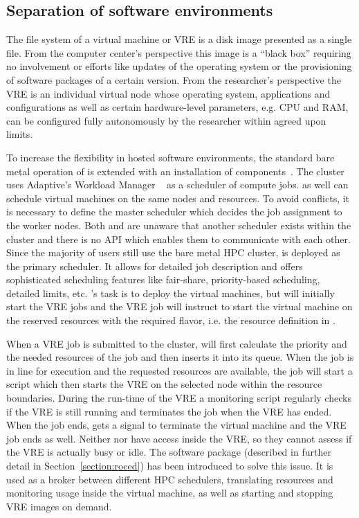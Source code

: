 \subsection{Separation of software environments}

The file system of a virtual machine or VRE is a
disk image presented as a single file. From the computer center's perspective
this image is a ``black box'' requiring no involvement or efforts like
updates of the operating system or the provisioning of software packages of a
certain version. From the researcher's perspective the VRE is an individual
virtual node whose operating system, applications and configurations
as well as certain hardware-level parameters, e.g. CPU and RAM, can be
configured fully autonomously by the researcher within agreed upon limits.


To increase the flexibility in hosted software environments, the standard bare metal
operation of \NEMO is extended with an installation of \Openstack
components~\cite{hpc-symp:2016}.
The \NEMO cluster uses Adaptive's Workload Manager \Moab~\cite{Moab} as a
scheduler of compute jobs.
\Openstack as well can schedule virtual machines on the same nodes and
resources.
To avoid conflicts, it is necessary to define the master scheduler
which decides the job assignment to the worker nodes.
Both \Moab and \Openstack are
unaware that another scheduler exists within the cluster and there is
no API which enables them to  communicate with each other. Since the majority of users still use the
bare metal HPC cluster, \Moab is deployed as the primary scheduler. It allows for
detailed job description and offers sophisticated scheduling features like
fair-share, priority-based scheduling, detailed limits,
etc. \Openstack 's task is to deploy the virtual machines, but \Moab will initially start the VRE
jobs and the VRE job will instruct \Openstack to start the virtual machine on the
reserved resources with the required flavor, i.e. the resource definition in \Openstack.

When a VRE job is submitted to the \NEMO cluster, \Moab will first calculate the
priority and the needed resources of the job and then inserts it into its queue.
When the job is in line for execution and the requested resources are available,
the job will start a script which then starts the VRE on the selected node
within the resource boundaries. During the run-time of the VRE a monitoring
script regularly checks if the VRE is still running and terminates the job when
the VRE has ended.
When the job ends, \Openstack gets a signal to terminate the virtual machine and
the VRE job ends as well.  Neither \Moab nor \Openstack have access
inside the VRE, so they cannot assess if the VRE is actually busy or
idle.
The software package \Roced (described in
further detail in Section~\ref{section:roced}) has been introduced to
solve this issue.
It is used as a broker between
different HPC schedulers,  translating resources and monitoring usage inside the
virtual machine, as well as starting and stopping VRE images on demand.

